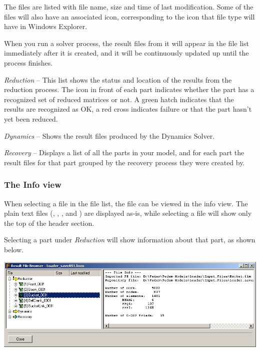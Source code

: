 The files are listed with file name, size and time of last modification.
Some of the files will also have an associated icon, corresponding to the icon
that file type will have in Windows Explorer.

When you run a solver process, the result files from it will appear in the file
list immediately after it is created, and it will be continuously updated up
until the process finishes.

\begin{bulletlist}
  \setcounter{enumi}{2}

\item{\sl Reduction} --
  This list shows the status and location of the results from the
  reduction process. The icon in front of each part indicates whether the part
  has a recognized set of reduced matrices or not.
  A green hatch indicates that the results are recognized as OK, a red cross
  indicates failure or that the part hasn't yet been reduced.

\item{\sl Dynamics} --
  Shows the result files produced by the Dynamics Solver.

\item{\sl Recovery} --
  Displays a list of all the parts in your model, and for each part the result
  files for that part grouped by the recovery process they were created by.
\end{bulletlist}


\clearpage

\subsubsection{The Info view}

When selecting a file in the file list, the file can be viewed in the info view.
The plain text files (, , ,  and
) are displayed as-is, while selecting a  file will show
only the top of the header section.

Selecting a part under {\sl Reduction} will show information about that part,
as shown below.

\medskip\noindent
\includegraphics[width=\textwidth]{Figures/8-LinkFileInfo}

